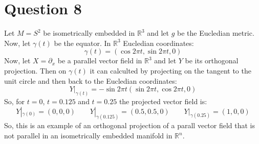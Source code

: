 \documentclass{article}
\newcommand{\R}{\ensuremath{\mathbb{R}}}
\begin{document}
\section*{Question 8}
Let $M = S^2$ be isometrically embedded in $\R^3$ and let $g$ be the Eucledian metric. Now, let $\gamma(t)$ be the equator. In $\R^3$ Eucledian coordinates:
\begin{equation}
    \gamma(t) = (\cos 2\pi t, \sin 2\pi t, 0)
\end{equation}
Now, let $X = \partial_x$ be a parallel vector field in $\R^3$ and let $Y$ be its orthogonal projection. Then on $\gamma(t)$ it can calculted by projecting on the tangent to the unit circle and then back to the Eucledian coordinates:
\begin{equation}
    Y|_{\gamma(t)} = -\sin 2\pi t (\sin 2\pi t, \cos 2\pi t, 0)
\end{equation}
So, for $t = 0$, $t = 0.125$ and $t = 0.25$ the projected vector field is:
\begin{equation}
    Y|_{\gamma(0)} = (0, 0, 0)
    \qquad
    Y|_{\gamma(0.125)} = (0.5, 0.5, 0)
    \qquad
    Y|_{\gamma(0.25)} = (1, 0, 0)
\end{equation}
So, this is an example of an orthogonal projection of a parall vector field that is not parallel in an isometrically embedded manifold in $\R^n$.
\end{document}
